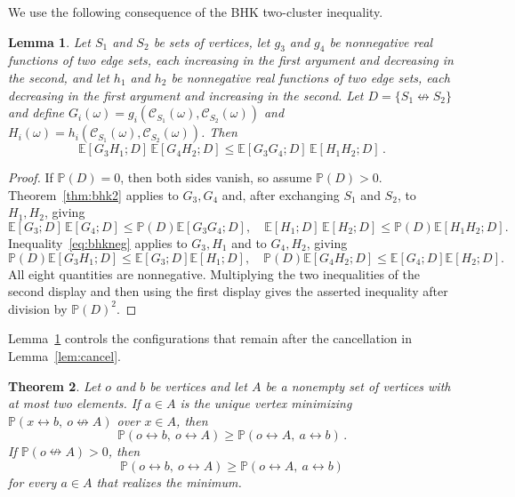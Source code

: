 \documentclass[11pt]{article}
\newtheorem{theorem}{Theorem}[section]
\newtheorem{lemma}[theorem]{Lemma}
\theoremstyle{definition}
\theoremstyle{remark}
\newcommand{\PP}{\mathbb P}
\newcommand{\EE}{\mathbb E}
\newcommand{\con}{\leftrightarrow}
\newcommand{\ncon}{\nleftrightarrow}
\newcommand{\eC}{\mathcal C}
\begin{document}
We use the following consequence of the BHK two-cluster inequality.

\begin{lemma}\label{lem:exch}
Let $S_1$ and $S_2$ be sets of vertices, let $g_3$ and $g_4$ be nonnegative real functions
of two edge sets, each increasing in the first argument and decreasing in the second, and
let $h_1$ and $h_2$ be nonnegative real functions of two edge sets, each decreasing in the
first argument and increasing in the second. Let $D=\{S_1\ncon S_2\}$ and define
$G_i(\omega)=g_i(\eC_{S_1}(\omega),\eC_{S_2}(\omega))$ and
$H_i(\omega)=h_i(\eC_{S_1}(\omega),\eC_{S_2}(\omega))$. Then
\[
 \EE[G_3H_1;D]\,\EE[G_4H_2;D]
 \leq \EE[G_3G_4;D]\,\EE[H_1H_2;D]\,.
\]
\end{lemma}

\begin{proof}
If $\PP(D)=0$, then both sides vanish, so assume $\PP(D)>0$.
Theorem~\ref{thm:bhk2} applies to $G_3,G_4$ and, after exchanging
$S_1$ and $S_2$, to $H_1,H_2$, giving
\[
 \EE[G_3;D]\,\EE[G_4;D]\leq\PP(D)\EE[G_3G_4;D],
 \quad
 \EE[H_1;D]\,\EE[H_2;D]\leq\PP(D)\EE[H_1H_2;D].
\]
Inequality~\eqref{eq:bhkneg} applies to $G_3,H_1$ and to $G_4,H_2$, giving
\[
 \PP(D)\EE[G_3H_1;D]\leq\EE[G_3;D]\EE[H_1;D],
 \quad
 \PP(D)\EE[G_4H_2;D]\leq\EE[G_4;D]\EE[H_2;D].
\]
All eight quantities are nonnegative. Multiplying the two inequalities of the second
display and then using the first display gives the asserted inequality after division by
$\PP(D)^2$.
\end{proof}

Lemma~\ref{lem:exch} controls the configurations that remain after the cancellation in
Lemma~\ref{lem:cancel}.

\begin{theorem}\label{thm:q8two}
Let $o$ and $b$ be vertices and let $A$ be a nonempty set of vertices with at most two
elements. If $a\in A$ is the unique vertex minimizing $\PP(x\con b,\ o\ncon A)$ over
$x\in A$, then
\[
 \PP(o\con b,\ o\con A)\geq\PP(o\con A,\ a\con b)\,.
\]
If $\PP(o\ncon A)>0$, then
\[
 \PP(o\con b,\ o\con A)\geq\PP(o\con A,\ a\con b)
\]
for every $a\in A$ that realizes the minimum.
\end{theorem}
\end{document}
